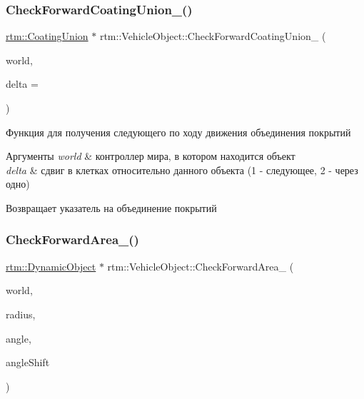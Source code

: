 \subsubsection{\texorpdfstring{Check\+Forward\+Coating\+Union\+\_\+()}{CheckForwardCoatingUnion\_()}}
{\footnotesize\ttfamily \hyperlink{classrtm_1_1_coating_union}{rtm\+::\+Coating\+Union} $\ast$ rtm\+::\+Vehicle\+Object\+::\+Check\+Forward\+Coating\+Union\+\_\+ (\begin{DoxyParamCaption}\item[{\hyperlink{classrtm_1_1_world_controller}{World\+Controller} $\ast$const}]{world,  }\item[{int}]{delta = {} }\end{DoxyParamCaption})\hspace{0.3cm}{\ttfamily [protected]}}



Функция для получения следующего по ходу движения объединения покрытий 


\begin{DoxyParams}{Аргументы}
{\em world} & контроллер мира, в котором находится объект \\
\hline
{\em delta} & сдвиг в клетках относительно данного объекта (1 -\/ следующее, 2 -\/ через одно) \\
\hline
\end{DoxyParams}
\begin{DoxyReturn}{Возвращает}
указатель на объединение покрытий 
\end{DoxyReturn}
\mbox{\label{classrtm_1_1_vehicle_object_a2bc87b24a74b9eefc4e63d6618052c33}} 
\subsubsection{\texorpdfstring{Check\+Forward\+Area\+\_\+()}{CheckForwardArea\_()}}
{\footnotesize\ttfamily \hyperlink{classrtm_1_1_dynamic_object}{rtm\+::\+Dynamic\+Object} $\ast$ rtm\+::\+Vehicle\+Object\+::\+Check\+Forward\+Area\+\_\+ (\begin{DoxyParamCaption}\item[{\hyperlink{classrtm_1_1_world_controller}{World\+Controller} $\ast$const}]{world,  }\item[{float}]{radius,  }\item[{float}]{angle,  }\item[{float}]{angle\+Shift }\end{DoxyParamCaption})\hspace{0.3cm}{\ttfamily [protected]}}



